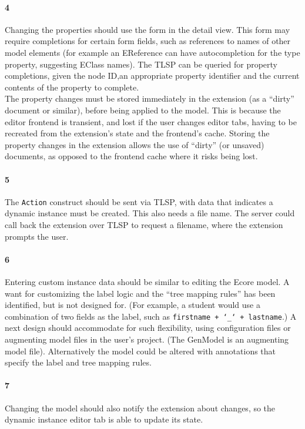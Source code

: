 \paragraph{4} Changing the properties should use the form in the detail view.
This form may require completions for certain form fields, such as references to names of other model elements (for example an EReference can have autocompletion for the type property, suggesting EClass names).
The \acrshort{TLSP} can be queried for property completions, given the node ID,an appropriate property identifier and the current contents of the property to complete.\\

The property changes must be stored immediately in the extension (as a ``dirty'' document or similar), before being applied to the model.
This is because the editor frontend is transient, and lost if the user changes editor tabs, having to be recreated from the extension's state and the frontend's cache.
Storing the property changes in the extension allows the use of ``dirty'' (or unsaved) documents, as opposed to the frontend cache where it risks being lost.

\paragraph{5} The \texttt{Action} construct should be sent via \acrshort{TLSP}, with data that indicates a dynamic instance must be created.
This also needs a file name.
The server could call back the extension over \acrshort{TLSP} to request a filename, where the extension prompts the user.

\paragraph{6} Entering custom instance data should be similar to editing the \gls{Ecore} model.
A want for customizing the label logic and the ``tree mapping rules'' has been identified, but is not designed for.
(For example, a student would use a combination of two fields as the label, such as \texttt{firstname + `\_` + lastname}.)
A next design should accommodate for such flexibility, using configuration files or augmenting model files in the user's project.
(The GenModel is an augmenting model file).
Alternatively the model could be altered with annotations that specify the label and tree mapping rules.

\paragraph{7} Changing the model should also notify the extension about changes, so the dynamic instance editor tab is able to update its state.

